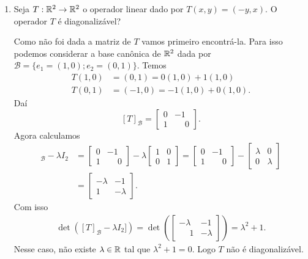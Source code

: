 \begin{exemplo}
    \begin{enumerate}[label={\arabic*})]
        \item Seja $T : \mathbb{R}^2 \to \mathbb{R}^2$ o operador linear dado por $T(x,y) = (-y,x)$. O operador $T$ é diagonalizável?
        \begin{solucao}
            Como não foi dada a matriz de $T$ vamos primeiro encontrá-la. Para isso podemos considerar a base canônica de $\mathbb{R}^2$ dada
            por $\mathcal{B} = \{e_1 = (1,0); e_2 = (0,1)\}$. Temos
            \begin{align}
                T(1,0) &= (0,1) = 0(1,0) + 1(1,0)\\
                T(0,1) &= (-1,0) = -1(1,0) + 0(1,0).
            \end{align}
            Daí
            \[
                [T]_\mathcal{B} = \begin{bmatrix}0 & -1\\ 1 & \phantom{-}0\end{bmatrix}.
            \]
            Agora calculamos
            \begin{align*}
                [T]_\mathcal{B} - \lambda I_2 &= \begin{bmatrix}0 & -1\\ 1 & \phantom{-}0\end{bmatrix} -
                \lambda\begin{bmatrix}1 & 0\\0 & 1\end{bmatrix} = \begin{bmatrix}0 & -1\\ 1 & \phantom{-}0\end{bmatrix} -
                \begin{bmatrix}\lambda & 0\\0 & \lambda\end{bmatrix}\\ &= \begin{bmatrix}-\lambda & -1\\ 1 & -\lambda\end{bmatrix}.
            \end{align*}
            Com isso
            \begin{align*}
                \det([T]_\mathcal{B} - \lambda I_2]) = \det\left(\begin{bmatrix} -\lambda & -1\\\phantom{-}1 & -\lambda\end{bmatrix}
                \right) = \lambda^2 + 1.
            \end{align*}
            Nesse caso, não existe $\lambda \in \mathbb{R}$ tal que $\lambda^2 + 1 = 0$. Logo $T$ não é diagonalizável.
        \end{solucao}


\end{enumerate}
\end{exemplo}
